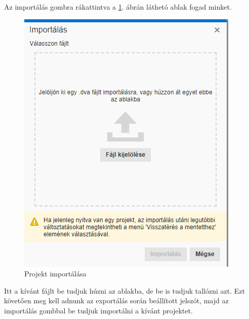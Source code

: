 Az importálás gombra rákattintva a \ref{fig:importalas2}. ábrán láthetó ablak fogad minket. 

\begin{figure}[h!]
	\centering
	\includegraphics[width=0.5\linewidth]{matyi_imgs/importalas2}
	\caption[Projekt importálása]{Projekt importálása}
	\label{fig:importalas2}
\end{figure}

Itt a kívánt fájlt be tudjuk húzni az ablakba, de be is tudjuk tallózni azt. Ezt követően meg kell adnunk az exportálás során beállított jelszót, majd az importálás gombbal be tudjuk importálni a kívánt projektet.
